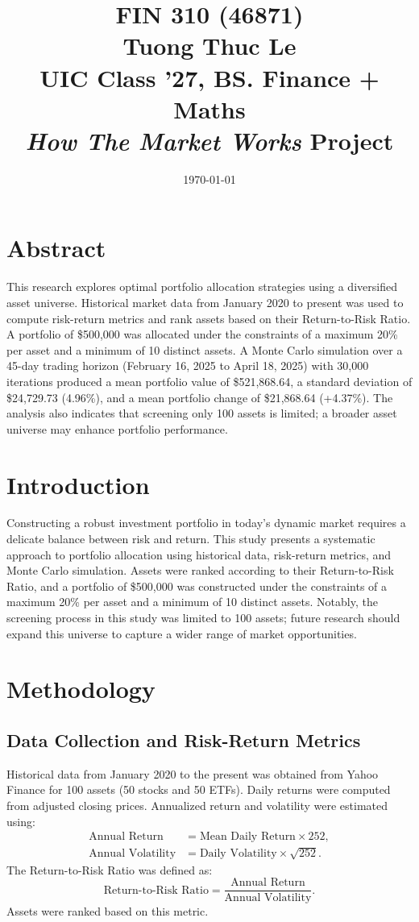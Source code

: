 \documentclass[11pt]{article}
\title{\vspace*{3cm}\centering FIN 310 (46871)\\[0.5em] Tuong Thuc Le\\[0.5em] UIC Class '27, BS. Finance + Maths\\[1em] \textit{How The Market Works} Project}
\author{}
\date{\vspace*{2cm} \today}
\begin{document}
\maketitle
\thispagestyle{empty}
\newpage

\tableofcontents
\newpage

\section*{Abstract}
This research explores optimal portfolio allocation strategies using a diversified asset universe. Historical market data from January 2020 to present was used to compute risk-return metrics and rank assets based on their Return-to-Risk Ratio. A portfolio of \$500,000 was allocated under the constraints of a maximum 20\% per asset and a minimum of 10 distinct assets. A Monte Carlo simulation over a 45-day trading horizon (February 16, 2025 to April 18, 2025) with 30,000 iterations produced a mean portfolio value of \$521,868.64, a standard deviation of \$24,729.73 (4.96\%), and a mean portfolio change of \$21,868.64 (+4.37\%). The analysis also indicates that screening only 100 assets is limited; a broader asset universe may enhance portfolio performance.

\section{Introduction}
Constructing a robust investment portfolio in today’s dynamic market requires a delicate balance between risk and return. This study presents a systematic approach to portfolio allocation using historical data, risk-return metrics, and Monte Carlo simulation. Assets were ranked according to their Return-to-Risk Ratio, and a portfolio of \$500,000 was constructed under the constraints of a maximum 20\% per asset and a minimum of 10 distinct assets. Notably, the screening process in this study was limited to 100 assets; future research should expand this universe to capture a wider range of market opportunities.

\section{Methodology}
\subsection{Data Collection and Risk-Return Metrics}
Historical data from January 2020 to the present was obtained from Yahoo Finance for 100 assets (50 stocks and 50 ETFs). Daily returns were computed from adjusted closing prices. Annualized return and volatility were estimated using:
\begin{align*}
\text{Annual Return} &= \text{Mean Daily Return} \times 252,\\[1ex]
\text{Annual Volatility} &= \text{Daily Volatility} \times \sqrt{252}.
\end{align*}
The Return-to-Risk Ratio was defined as:
\[
\text{Return-to-Risk Ratio} = \frac{\text{Annual Return}}{\text{Annual Volatility}}.
\]
Assets were ranked based on this metric.
\end{document}
